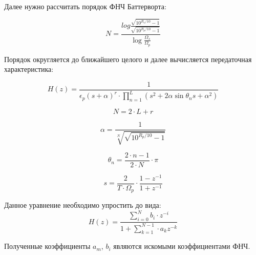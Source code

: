 Далее нужно рассчитать порядок ФНЧ Баттерворта:

\begin{equation}
    \label{eq:domain:NIIC}
    N=\frac{log{\frac{\sqrt{10^{R_{s}/10}-1}}
                     {\sqrt{10^{R_{p}/10}-1}}}}
           {\log{\frac{\Omega_{s}}
                      {\Omega_{p}}}}
    \end{equation}

Порядок округляется до ближайшего целого и далее вычисляется передаточная характеристика:

\begin{equation}
    \label{eq:domain:Hz}
    H(z) = \frac{1}
                {\epsilon_{p} (s + \alpha )^r \cdot \prod_{n=1}^{L} (s^{2} + 2 \alpha \sin{ \theta_{n} s + \alpha^{2}})}
    \end{equation}

\begin{equation}
        \label{eq:domain:whereN}
        N=2 \cdot L+r
        \end{equation}

\begin{equation}
        \label{eq:domain:whereAlpha}
        \alpha=\frac{1}
                    {\sqrt[N]{\sqrt{10^{R_{p}/10}-1}}}
        \end{equation}

\begin{equation}
        \label{eq:domain:whereTheta}
        \theta_{n}=\frac{2\cdot n - 1}
                        {2\cdot N} \cdot \pi
        \end{equation}

\begin{equation}
        \label{eq:domain:whereS}
        s=\frac{2}
                {T\cdot \Omega_{p}} \cdot \frac{1-z^{-1}}
                                                {1+z^{-1}}
        \end{equation}

Данное уравнение необходимо упростить до вида:
\begin{equation}
    \label{eq:domain:canonHz}
    H(z)=\frac{\sum_{i=0}^{N}b_{i}\cdot z^{-i}}{1+\sum_{k=1}^{N-1}\cdot a_{k}z^{-k}}
    \end{equation}

Полученные коэффициенты $a_{m}$, $b_{i}$ являются искомыми коэффициентами ФНЧ. %
